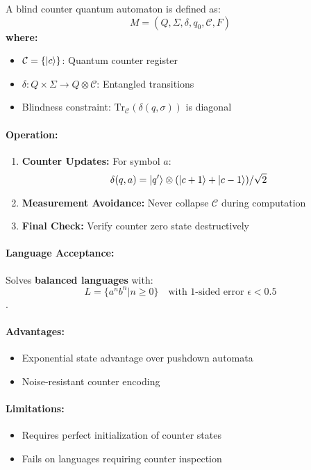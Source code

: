 \begin{definition}
A blind counter quantum automaton is defined as:
\[
M = (Q, \Sigma, \delta, q_0, \mathcal{C}, F)
\]
\textbf{where:}
\begin{itemize}
    \item $\mathcal{C} = \{\ket{c}\}$: Quantum counter register
    \item $\delta: Q \times \Sigma \rightarrow Q \otimes \mathcal{C}$: Entangled transitions
    \item Blindness constraint: $\text{Tr}_\mathcal{C}(\delta(q,\sigma))$ is diagonal
\end{itemize}
\end{definition}

\paragraph{Operation:}
\begin{enumerate}
    \item \textbf{Counter Updates:} For symbol $a$:
    \[
    \delta(q,a) = \ket{q'} \otimes (\ket{c+1} + \ket{c-1})/\sqrt{2}
    \]
    \item \textbf{Measurement Avoidance:} Never collapse $\mathcal{C}$ during computation
    \item \textbf{Final Check:} Verify counter zero state destructively
\end{enumerate}

\paragraph{Language Acceptance:}
Solves \textbf{balanced languages} with:
\[
L = \{a^nb^n | n \geq 0\} \quad \text{with 1-sided error } \epsilon < 0.5 
\]
\cite{ambainis1998one, nakanishi2004}.

\paragraph{Advantages:}
\begin{itemize}
    \item Exponential state advantage over pushdown automata
    \item Noise-resistant counter encoding
\end{itemize}

\paragraph{Limitations:}
\begin{itemize}
    \item Requires perfect initialization of counter states
    \item Fails on languages requiring counter inspection
\end{itemize}

